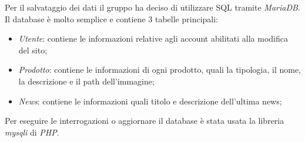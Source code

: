 Per il salvataggio dei dati il gruppo ha deciso di utilizzare SQL tramite \emph{MariaDB}.\\
Il database è molto semplice e contiene 3 tabelle principali:
\begin{itemize}
    \item \emph{Utente}: contiene le informazioni relative agli account abilitati alla modifica del sito;
    \item \emph{Prodotto}: contiene le informazioni di ogni prodotto, quali la tipologia, il nome, la descrizione e il path dell'immagine;
    \item \emph{News}: contiene le informazioni quali titolo e descrizione dell'ultima news;
\end{itemize}
Per eseguire le interrogazioni o aggiornare il database è stata usata la libreria \emph{mysqli} di \emph{PHP}.
